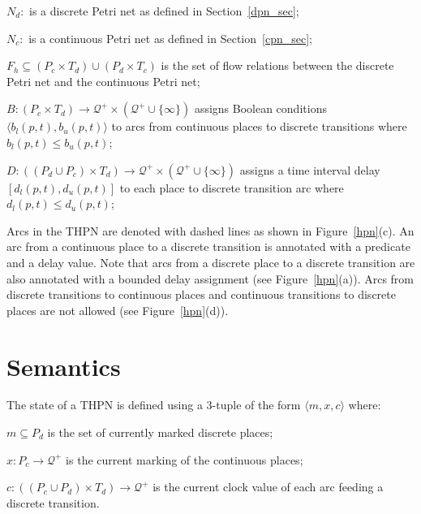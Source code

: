 \documentclass[11pt,times]{article}
\begin{document}
\begin{description}
\item $N_d:$ is a discrete Petri net as defined in Section~\ref{dpn_sec};
\item $N_c:$ is a continuous Petri net as defined in Section~\ref{cpn_sec};
\item $F_h \subseteq (P_c \times T_d) \cup (P_d \times T_c)$ is the
  set of flow relations between the discrete Petri net and the
  continuous Petri net;
\item $B: (P_c \times T_d)  \rightarrow \mathcal{Q}^+
  \times (\mathcal{Q}^+ \cup \{\infty\})$ assigns Boolean conditions
  $\langle b_l(p,t), b_u(p,t) \rangle$ to arcs from continuous places to 
  discrete transitions where $b_l(p, t) \leq b_u(p,t)$;
\item $D: ((P_d \cup P_c) \times T_d) \rightarrow \mathcal{Q}^+
  \times (\mathcal{Q}^+ \cup
  \{\infty\})$ assigns a time interval delay $[d_l(p,t), d_u(p,t)]$
  to each place to discrete transition arc where $d_l(p,t) \leq d_u(p,t)$;
\end{description}

Arcs in the THPN are denoted with dashed lines as shown in 
Figure~\ref{hpn}(c).  An arc from a continuous
place to a discrete transition is annotated with a predicate and a delay value.
Note that arcs from a discrete place to a discrete transition are also 
annotated with a bounded delay assignment (see Figure~\ref{hpn}(a)).
Arcs from discrete transitions to continuous places and continuous transitions 
to discrete places are not allowed (see Figure~\ref{hpn}(d)).

\section{Semantics}

The state of a THPN is defined using a 3-tuple of the form $\langle m, x, c
\rangle$ where:

\begin{description}
\item $m \subseteq P_d$ is the set of currently marked discrete places;
\item $x: P_c \rightarrow \mathcal{Q}^+$ is the current marking of
  the continuous places;
\item $c: ((P_c \cup P_d) \times T_d) \rightarrow \mathcal{Q}^+$ is the
  current clock value of each arc feeding a discrete transition.
\end{description}
\end{document}
